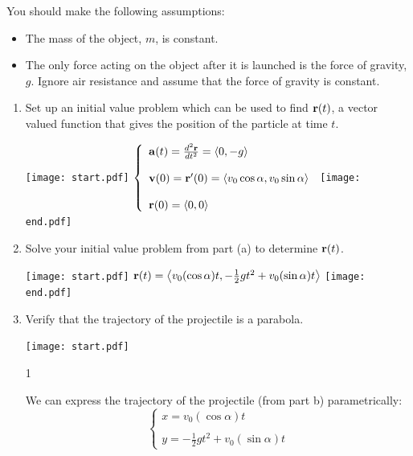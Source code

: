 \documentclass[12pt]{article}
\begin{document}
\begin{enumerate}
You should make the following assumptions:

\begin{itemize}

\item The mass of the object, $m$, is constant.

\item The only force acting on the object after it is launched is the force of gravity, $g$.  Ignore air resistance and assume that the force of gravity is constant.

\end{itemize}

\begin{enumerate}

\item Set up an initial value problem which can be used to find ${\bf r}(t)$, a vector valued function that gives the position of the particle at time $t$.

\texttt{[image: start.pdf]}
{{$\left\{\begin{array}{l}
{\bf a}(t)=\frac{d^2{\bf r}}{dt^2}=\langle 0, -g \rangle\\
\\
{\bf v}(0)={\bf r}^{\prime}(0)=\langle v_0\cos{\alpha}, v_0\sin{\alpha} \rangle\\
\\
{\bf r}(0)= \langle 0,0 \rangle\end{array}\right.$}}
\texttt{[image: end.pdf]}


\item Solve your initial value problem from part (a) to determine ${\bf r}(t)$.

\texttt{[image: start.pdf]}
{{${\bf r}(t)=\left\langle v_0(\cos{\alpha})t, -\frac{1}{2}gt^2+v_0(\sin\alpha)t\right\rangle$}}
\texttt{[image: end.pdf]}


\item Verify that the trajectory of the projectile is a parabola.

\texttt{[image: start.pdf]}
{{{1\linewidth}{We can express the trajectory of the projectile (from part b) parametrically:\\
$$\left\{\begin{array}{l}
x=v_0(\cos{\alpha})t\\
\\
y=-\frac{1}{2}gt^2+v_0(\sin\alpha)t\end{array}\right.$$

}}}
\end{enumerate}
\end{enumerate}
\end{document}
